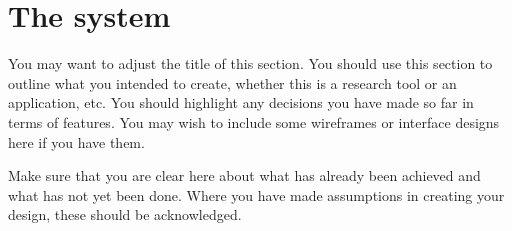 \section{The system}
You may want to adjust the title of this section. You should use this section to outline what you intended to create, whether this is a research tool or an application, etc. You should highlight any decisions you have made so far in terms of features. You may wish to include some wireframes or interface designs here if you have them. 

Make sure that you are clear here about what has already been achieved and what has not yet been done. Where you have made assumptions in creating your design, these should be acknowledged.